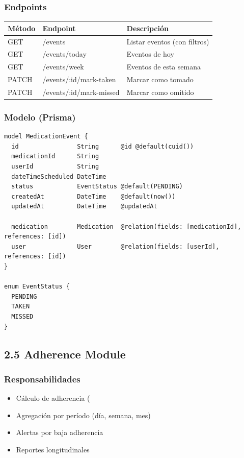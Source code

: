 \documentclass[12pt,a4paper]{article}
\begin{document}
\subsubsection{Endpoints}

\begin{center}
\begin{tabular}{|l|l|l|}
\hline
\rowcolor{lightblue}
\textbf{Método} & \textbf{Endpoint} & \textbf{Descripción} \\
\hline
GET & /events & Listar eventos (con filtros) \\
\hline
GET & /events/today & Eventos de hoy \\
\hline
GET & /events/week & Eventos de esta semana \\
\hline
PATCH & /events/:id/mark-taken & Marcar como tomado \\
\hline
PATCH & /events/:id/mark-missed & Marcar como omitido \\
\hline
\end{tabular}
\end{center}

\subsubsection{Modelo (Prisma)}

\begin{verbatim}
model MedicationEvent {
  id                String      @id @default(cuid())
  medicationId      String
  userId            String
  dateTimeScheduled DateTime
  status            EventStatus @default(PENDING)
  createdAt         DateTime    @default(now())
  updatedAt         DateTime    @updatedAt
  
  medication        Medication  @relation(fields: [medicationId], references: [id])
  user              User        @relation(fields: [userId], references: [id])
}

enum EventStatus {
  PENDING
  TAKEN
  MISSED
}
\end{verbatim}

\subsection{2.5 Adherence Module}

\subsubsection{Responsabilidades}
\begin{itemize}
    \item Cálculo de adherencia (%
    \item Agregación por período (día, semana, mes)
    \item Alertas por baja adherencia
    \item Reportes longitudinales
\end{itemize}
\end{document}
